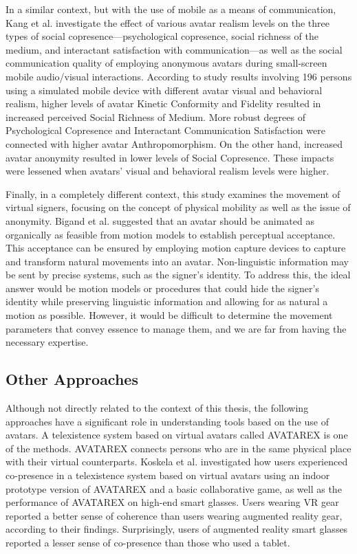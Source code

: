 In a similar context, but with the use of mobile as a means of communication, Kang et al. \cite{KAN13} investigate the effect of various avatar realism levels on the three types of social copresence—psychological copresence, social richness of the medium, and interactant satisfaction with communication—as well as the social communication quality of employing anonymous avatars during small-screen mobile audio/visual interactions. According to study results involving 196 persons using a simulated mobile device with different avatar visual and behavioral realism, higher levels of avatar Kinetic Conformity and Fidelity resulted in increased perceived Social Richness of Medium. More robust degrees of Psychological Copresence and Interactant Communication Satisfaction were connected with higher avatar Anthropomorphism. On the other hand, increased avatar anonymity resulted in lower levels of Social Copresence. These impacts were lessened when avatars' visual and behavioral realism levels were higher.

Finally, in a completely different context, this study examines the movement of virtual signers, focusing on the concept of physical mobility as well as the issue of anonymity. Bigand et al. \cite{BIG19} suggested that an avatar should be animated as organically as feasible from motion models to establish perceptual acceptance. This acceptance can be ensured by employing motion capture devices to capture and transform natural movements into an avatar. Non-linguistic information may be sent by precise systems, such as the signer's identity. To address this, the ideal answer would be motion models or procedures that could hide the signer's identity while preserving linguistic information and allowing for as natural a motion as possible. However, it would be difficult to determine the movement parameters that convey essence to manage them, and we are far from having the necessary expertise.

\subsection{Other Approaches}
Although not directly related to the context of this thesis, the following approaches have a significant role in understanding tools based on the use of avatars. A telexistence system based on virtual avatars called AVATAREX is one of the methods. AVATAREX connects persons who are in the same physical place with their virtual counterparts. Koskela et al. \cite{KOS18} investigated how users experienced co-presence in a telexistence system based on virtual avatars using an indoor prototype version of AVATAREX and a basic collaborative game, as well as the performance of AVATAREX on high-end smart glasses. Users wearing VR gear reported a better sense of coherence than users wearing augmented reality gear, according to their findings. Surprisingly, users of augmented reality smart glasses reported a lesser sense of co-presence than those who used a tablet.

